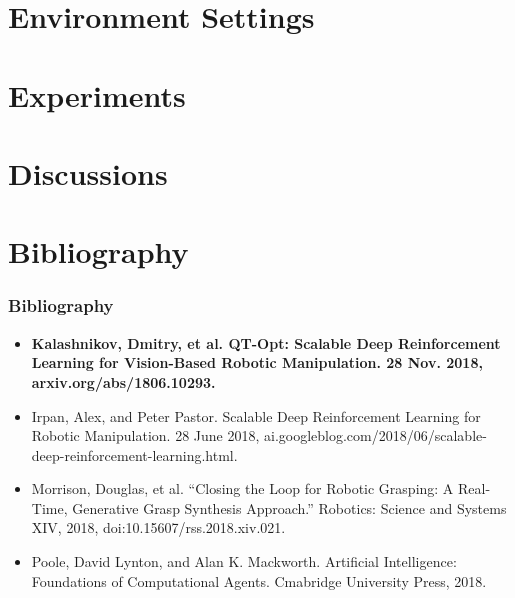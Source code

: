 \documentclass{beamer}
\newcommand{\fifthSec}{Environment Settings}
\newcommand{\sixthSec}{Experiments}
\newcommand{\seventhSec}{Discussions}
\newcommand{\refSec}{Bibliography}
\begin{document}
  \section{\fifthSec}


  \section{\sixthSec}


  \section{\seventhSec}


  \section{\refSec}
    \begin{frame}[allowframebreaks]
      \frametitle{\refSec}
      \begin{itemize}
        \item \textbf{Kalashnikov, Dmitry, et al. QT-Opt: Scalable Deep Reinforcement Learning for Vision-Based Robotic Manipulation. 28 Nov. 2018, arxiv.org/abs/1806.10293.}
        \item Irpan, Alex, and Peter Pastor. Scalable Deep Reinforcement Learning for Robotic Manipulation. 28 June 2018, ai.googleblog.com/2018/06/scalable-deep-reinforcement-learning.html.
        \item Morrison, Douglas, et al. “Closing the Loop for Robotic Grasping: A Real-Time, Generative Grasp Synthesis Approach.” Robotics: Science and Systems XIV, 2018, doi:10.15607/rss.2018.xiv.021.
        \item Poole, David Lynton, and Alan K. Mackworth. Artificial Intelligence: Foundations of Computational Agents. Cmabridge University Press, 2018.
      \end{itemize}
    \end{frame}
\end{document}
